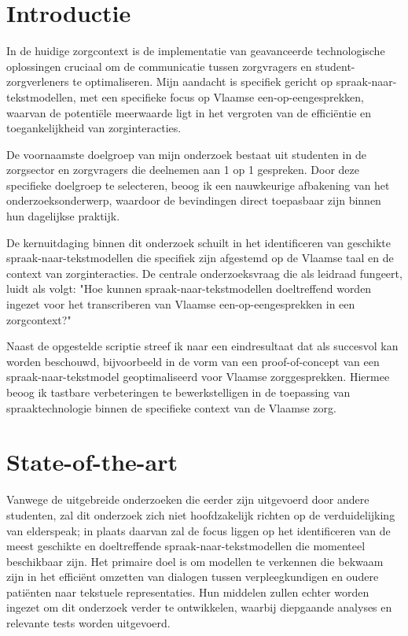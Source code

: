 
\section{Introductie}%
\label{sec:introductie}


In de huidige zorgcontext is de implementatie van geavanceerde technologische oplossingen cruciaal om de communicatie tussen zorgvragers en student-zorgverleners te optimaliseren. Mijn aandacht is specifiek gericht op spraak-naar-tekstmodellen, met een specifieke focus op Vlaamse een-op-eengesprekken, waarvan de potentiële meerwaarde ligt in het vergroten van de efficiëntie en toegankelijkheid van zorginteracties.

De voornaamste doelgroep van mijn onderzoek bestaat uit studenten in de zorgsector en zorgvragers die deelnemen aan 1 op 1 gespreken. Door deze specifieke doelgroep te selecteren, beoog ik een nauwkeurige afbakening van het onderzoeksonderwerp, waardoor de bevindingen direct toepasbaar zijn binnen hun dagelijkse praktijk.

De kernuitdaging binnen dit onderzoek schuilt in het identificeren van geschikte spraak-naar-tekstmodellen die specifiek zijn afgestemd op de Vlaamse taal en de context van zorginteracties. De centrale onderzoeksvraag die als leidraad fungeert, luidt als volgt: "Hoe kunnen spraak-naar-tekstmodellen doeltreffend worden ingezet voor het transcriberen van Vlaamse een-op-eengesprekken in een zorgcontext?"

Naast de opgestelde scriptie streef ik naar een eindresultaat dat als succesvol kan worden beschouwd, bijvoorbeeld in de vorm van een proof-of-concept van een spraak-naar-tekstmodel geoptimaliseerd voor Vlaamse zorggesprekken. Hiermee beoog ik tastbare verbeteringen te bewerkstelligen in de toepassing van spraaktechnologie binnen de specifieke context van de Vlaamse zorg.


\section{State-of-the-art}%
\label{sec:state-of-the-art}

Vanwege de uitgebreide onderzoeken die eerder zijn uitgevoerd door andere studenten, zal dit onderzoek zich niet hoofdzakelijk richten op de verduidelijking van elderspeak; in plaats daarvan zal de focus liggen op het identificeren van de meest geschikte en doeltreffende spraak-naar-tekstmodellen die momenteel beschikbaar zijn. Het primaire doel is om modellen te verkennen die bekwaam zijn in het efficiënt omzetten van dialogen tussen verpleegkundigen en oudere patiënten naar tekstuele representaties. Hun middelen zullen echter worden ingezet om dit onderzoek verder te ontwikkelen, waarbij diepgaande analyses en relevante tests worden uitgevoerd.

